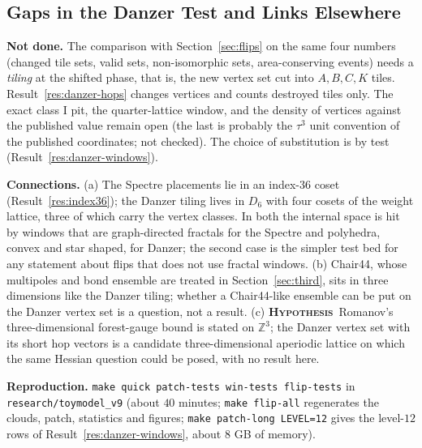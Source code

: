 \documentclass[11pt]{article}
\newcommand{\hypo}{\textbf{\textsc{Hypothesis}}}
\theoremstyle{definition}
\begin{document}
\subsection{Gaps in the Danzer Test and Links Elsewhere}
\label{sec:danzer-limits}
\textbf{Not done.} The comparison with Section~\ref{sec:flips} on the same four numbers (changed tile sets, valid sets, non-isomorphic sets, area-conserving events) needs a \emph{tiling} at the shifted phase, that is, the new vertex set cut into $A,B,C,K$ tiles.
Result~\ref{res:danzer-hops} changes vertices and counts destroyed tiles only. The exact class I pit, the quarter-lattice window, and the density of vertices against the published value remain open (the last is probably the $\tau^3$ unit convention of the published coordinates; not checked). The choice of substitution is by test (Result~\ref{res:danzer-windows}).

\textbf{Connections.} (a) The Spectre placements lie in an index-$36$ coset (Result~\ref{res:index36}); the Danzer tiling lives in $D_6$ with four cosets of the weight lattice, three of which carry the vertex classes. In both the internal space is hit by windows that are graph-directed fractals for the Spectre and polyhedra, convex and star shaped, for Danzer; the second case is the simpler test bed for any statement about flips that does not use fractal windows. (b) Chair44, whose multipoles and bond ensemble are treated in Section~\ref{sec:third}, sits in three dimensions like the Danzer tiling; whether a Chair44-like ensemble can be put on the Danzer vertex set is a question, not a result. (c) \hypo\ Romanov's three-dimensional forest-gauge bound \cite{romanov2026} is stated on $\mathbb{Z}^3$; the Danzer vertex set with its short hop vectors is a candidate three-dimensional aperiodic lattice on which the same Hessian question could be posed, with no result here.

\textbf{Reproduction.} \texttt{make quick patch-tests win-tests flip-tests} in \texttt{research/toymodel\_v9} (about $40$ minutes; \texttt{make flip-all} regenerates the clouds, patch, statistics and figures; \texttt{make patch-long LEVEL=12} gives the level-$12$ rows of Result~\ref{res:danzer-windows}, about $8$ GB of memory).




\end{document}
